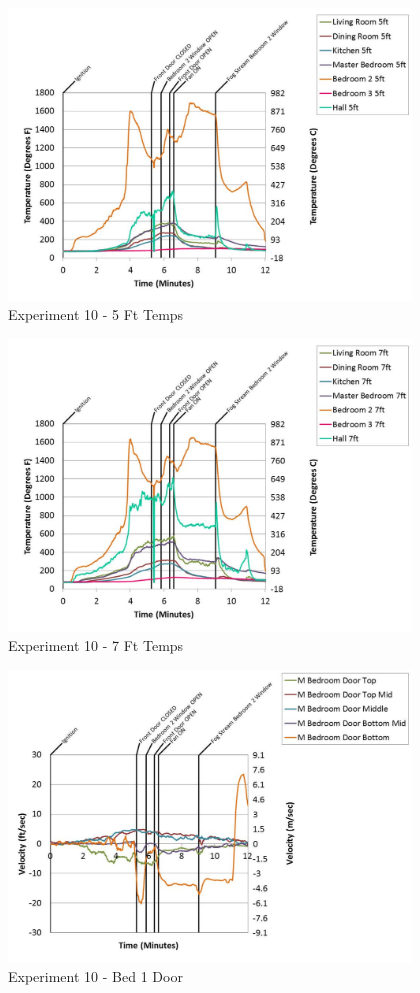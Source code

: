 \documentclass{article}
\begin{document}
\begin{appendices}
	\begin{figure}[h!]
		\centering
		\includegraphics[height=3.05in]{0_Images/Results_Charts/Exp_10_Charts/5FtTemps.pdf}
		\caption{Experiment 10 - 5 Ft Temps}
	\end{figure}
 

	\begin{figure}[h!]
		\centering
		\includegraphics[height=3.05in]{0_Images/Results_Charts/Exp_10_Charts/7FtTemps.pdf}
		\caption{Experiment 10 - 7 Ft Temps}
	\end{figure}
 
	\clearpage

	\begin{figure}[h!]
		\centering
		\includegraphics[height=3.05in]{0_Images/Results_Charts/Exp_10_Charts/Bed1Door.pdf}
		\caption{Experiment 10 - Bed 1 Door}
	\end{figure}
 


\end{appendices}
\end{document}
